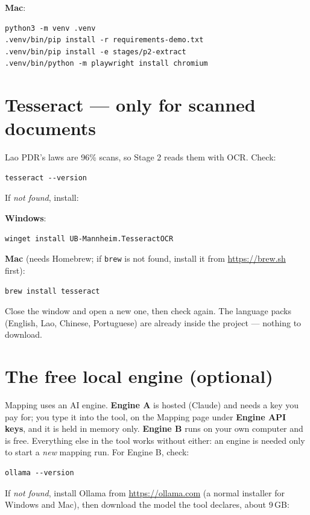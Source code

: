 \documentclass[11pt,a4paper]{article}
\newcommand{\win}{\textbf{Windows}}
\newcommand{\mac}{\textbf{Mac}}
\begin{document}
\mac:
\begin{lstlisting}
python3 -m venv .venv
.venv/bin/pip install -r requirements-demo.txt
.venv/bin/pip install -e stages/p2-extract
.venv/bin/python -m playwright install chromium
\end{lstlisting}

\section{Tesseract --- only for scanned documents}

Lao PDR's laws are 96\% scans, so Stage 2 reads them with OCR. Check:

\begin{lstlisting}
tesseract --version
\end{lstlisting}

If \emph{not found}, install:

\win:
\begin{lstlisting}
winget install UB-Mannheim.TesseractOCR
\end{lstlisting}

\mac{} (needs Homebrew; if \texttt{brew} is not found, install it from \url{https://brew.sh} first):
\begin{lstlisting}
brew install tesseract
\end{lstlisting}

Close the window and open a new one, then check again. The language packs (English, Lao,
Chinese, Portuguese) are already inside the project --- nothing to download.

\section{The free local engine (optional)}

Mapping uses an AI engine. \textbf{Engine A} is hosted (Claude) and needs a key you pay
for; you type it into the tool, on the Mapping page under \textbf{Engine API keys}, and it
is held in memory only. \textbf{Engine B} runs on your own computer and is free.
Everything else in the tool works without either: an engine is needed only to start a
\emph{new} mapping run. For Engine B, check:

\begin{lstlisting}
ollama --version
\end{lstlisting}

If \emph{not found}, install Ollama from \url{https://ollama.com} (a normal installer for
Windows and Mac), then download the model the tool declares, about 9\,GB:
\end{document}
